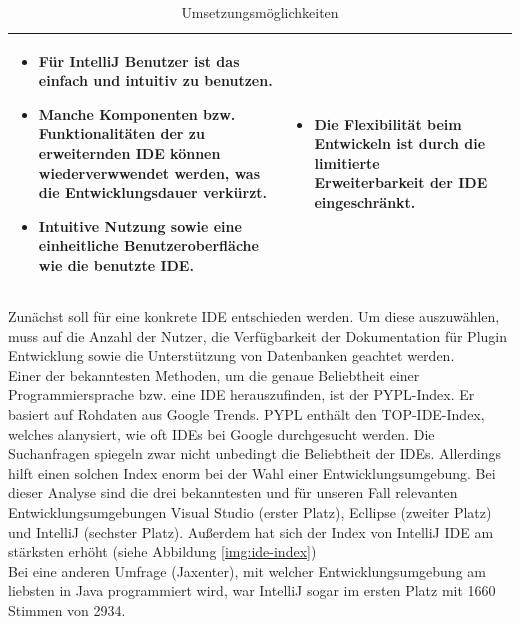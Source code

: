 \begin{table}
\begin{tabular}{ |p{3cm}|p{6cm}|p{6cm}| }
			\begin{itemize}
				\item Für IntelliJ Benutzer ist das einfach und intuitiv zu benutzen.
				\item Manche Komponenten bzw. Funktionalitäten der zu erweiternden IDE können wiederverwwendet werden, was die Entwicklungsdauer verkürzt.
				\item Intuitive Nutzung sowie eine einheitliche Benutzeroberfläche wie die benutzte IDE.
			\end{itemize} &
			
			\begin{itemize}
				\item Die Flexibilität beim Entwickeln ist durch die limitierte Erweiterbarkeit der IDE eingeschränkt.
			\end{itemize} \\
			\hline
			
		\end{tabular}
		\caption{Umsetzungsmöglichkeiten}
		\label{table:tool-options}
	\end{table}
	
	Zunächst soll für eine konkrete IDE entschieden werden. Um diese auszuwählen, muss auf die Anzahl der Nutzer, die Verfügbarkeit der Dokumentation für Plugin Entwicklung sowie die Unterstützung von Datenbanken geachtet werden.\\
	Einer der bekanntesten Methoden, um die genaue Beliebtheit einer Programmiersprache bzw. eine IDE herauszufinden, ist der PYPL-Index. Er basiert auf Rohdaten aus Google Trends. PYPL enthält den TOP-IDE-Index, welches alanysiert, wie oft IDEs bei Google durchgesucht werden. Die Suchanfragen spiegeln zwar nicht unbedingt die Beliebtheit der IDEs. Allerdings hilft einen solchen Index enorm bei der Wahl einer Entwicklungsumgebung.
	Bei dieser Analyse sind die drei bekanntesten und für unseren Fall relevanten Entwicklungsumgebungen Visual Studio (erster Platz), Ecllipse (zweiter Platz) und IntelliJ (sechster Platz). Außerdem hat sich der Index von IntelliJ IDE am stärksten erhöht (siehe Abbildung \ref{img:ide-index})\\
	Bei eine anderen Umfrage (Jaxenter), mit welcher Entwicklungsumgebung am liebsten in Java programmiert wird, war IntelliJ sogar im ersten Platz mit 1660 Stimmen von 2934. \\
	
